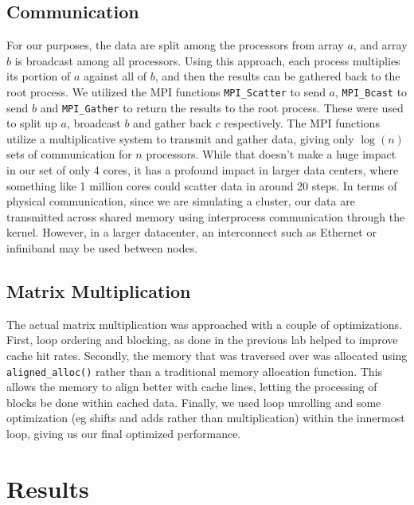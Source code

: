 \documentclass[letterpaper,twocolumn,10pt]{article}
\def\code#1{\texttt{#1}}
\begin{document}
\subsection{Communication}
For our purposes, the data are split among the processors from array $a$, and
array $b$ is broadcast among all processors. Using this approach, each process
multiplies its portion of $a$ against all of $b$, and then the results can be
gathered back to the root process. We utilized the MPI functions 
\code{MPI\_Scatter} to send $a$, \code{MPI\_Bcast} to send $b$ and 
\code{MPI\_Gather} to return the results to the root process. These were used
to split up $a$, broadcast $b$ and gather back $c$ respectively. The MPI 
functions utilize a multiplicative system to transmit and gather data, giving
only $\log(n)$ sets of communication for $n$ processors. While that doesn't
make a huge impact in our set of only 4 cores, it has a profound impact in
larger data centers, where something like 1 million cores could scatter data
in around 20 steps. In terms of physical communication, since we are simulating
a cluster, our data are transmitted across shared memory using interprocess
communication through the kernel. However, in a larger datacenter, an
interconnect such as Ethernet or infiniband may be used between nodes.

\subsection{Matrix Multiplication}
The actual matrix multiplication was approached with a couple of optimizations.
First, loop ordering and blocking, as done in the previous lab helped to improve
cache hit rates. Secondly, the memory that was traversed over was allocated 
using \code{aligned\_alloc()} rather than a traditional memory allocation
function. This allows the memory to align better with cache lines, letting the
processing of blocks be done within cached data. Finally, we used loop unrolling
and some optimization (eg shifts and adds rather than multiplication) within
the innermost loop, giving us our final optimized performance.

\section{Results}
\end{document}
